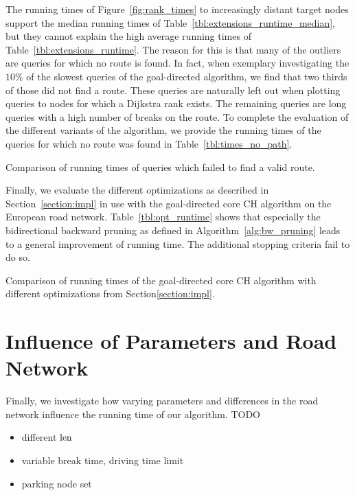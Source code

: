 The running times of Figure~\ref{fig:rank_times} to increasingly distant target nodes support the median running times of Table~\ref{tbl:extensions_runtime_median}, but they cannot explain the high average running times of Table~\ref{tbl:extensions_runtime}. The reason for this is that many of the outliers are queries for which no route is found. In fact, when exemplary investigating the $10\%$ of the slowest queries of the goal-directed algorithm, we find that two thirds of those did not find a route. These queries are naturally left out when plotting queries to nodes for which a Dijkstra rank exists. The remaining queries are long queries with a high number of breaks on the route. To complete the evaluation of the different variants of the algorithm, we provide the running times of the queries for which no route was found in Table~\ref{tbl:times_no_path}.

\begin{table}[hbtp]
	\centering
	
	\caption{Comparison of running times of queries which failed to find a valid route.}
	\label{tbl:times_no_path}
\end{table}

Finally, we evaluate the different optimizations as described in Section~\ref{section:impl} in use with the goal-directed core CH algorithm on the European road network. Table~\ref{tbl:opt_runtime} shows that especially the bidirectional backward pruning as defined in Algorithm~\ref{alg:bw_pruning} leads to a general improvement of running time. The additional stopping criteria fail to do so.

\begin{table}[hbtp]
	\centering
	
	\caption{Comparison of running times of the goal-directed core CH algorithm with different optimizations from Section\ref{section:impl}.}
	\label{tbl:opt_runtime}
\end{table}

\section{Influence of Parameters and Road Network}
Finally, we investigate how varying parameters and differences in the road network influence the running time of our algorithm. TODO


\begin{itemize}
	\item different $\operatorname{len}$
	\item variable break time, driving time limit
	\item parking node set
\end{itemize}